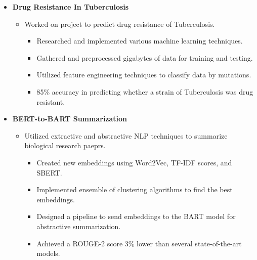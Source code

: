 \documentclass[11pt]{article}
\begin{document}
\begin{minipage}{0.95\textwidth}
\begin{itemize}
\begin{itemize}
            \end{itemize}

      \item \textbf{Drug Resistance In Tuberculosis}
         \vspace{-0.4cm}

         \begin{itemize}\setlength\itemsep{-0.5cm}
            \item Worked on project to predict drug resistance of Tuberculosis.
            \vspace{-0.1cm}

            \begin{itemize}\setlength\itemsep{-0.05cm}
               \item Researched and implemented various machine learning techniques.
               \item Gathered and preprocessed gigabytes of data for training and testing.
               \item Utilized feature engineering techniques to classify data by mutations.
               \item 85\% accuracy in predicting whether a strain of Tuberculosis was drug resistant.
            \end{itemize}

         \end{itemize}

         \item \textbf{BERT-to-BART Summarization}
         \vspace{-0.4cm}

         \begin{itemize}\setlength\itemsep{-0.5cm}
            \item Utilized extractive and abstractive NLP techniques to summarize biological research paeprs.
            \vspace{-0.1cm}

            \begin{itemize}\setlength\itemsep{-0.05cm}
               \item Created new embeddings using Word2Vec, TF-IDF scores, and SBERT.
               \item Implemented ensemble of clustering algorithms to find the best embeddings.
               \item Designed a pipeline to send embeddings to the BART model for abstractive summarization.
               \item Achieved a ROUGE-2 score 3\% lower than several state-of-the-art models.
            \end{itemize}

         \end{itemize}

      \end{itemize}
      
   \end{minipage}
\end{document}
